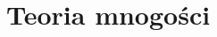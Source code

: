 \documentclass[a4paper,11pt]{article}
\numberwithin{equation}{section}
\begin{document}
\newpage
\section{Teoria mnogości}















\printbibliography





\end{document}
